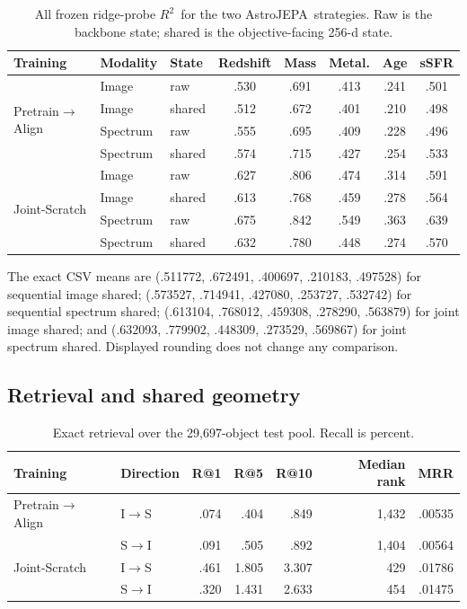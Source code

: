 \documentclass{article}
\newcommand{\method}{AstroJEPA}
\newcommand{\prealign}{Pretrain$\rightarrow$Align}
\newcommand{\joint}{Joint-Scratch}
\newcommand{\rscore}{$R^2$}
\begin{document}
\begin{table}[h]
\centering
\caption{All frozen ridge-probe \rscore\ for the two \method\ strategies.
Raw is the backbone state; shared is the objective-facing 256-d state.}
\label{tab:full_strategy_probes}
\scriptsize
\setlength{\tabcolsep}{3.6pt}
\begin{tabular}{lllccccc}
\toprule
Training & Modality & State & Redshift & Mass & Metal. & Age & sSFR\\
\midrule
\multirow{4}{*}{\prealign}
& Image & raw & .530 & .691 & .413 & .241 & .501\\
& Image & shared & .512 & .672 & .401 & .210 & .498\\
& Spectrum & raw & .555 & .695 & .409 & .228 & .496\\
& Spectrum & shared & .574 & .715 & .427 & .254 & .533\\
\midrule
\multirow{4}{*}{\joint}
& Image & raw & .627 & .806 & .474 & .314 & .591\\
& Image & shared & .613 & .768 & .459 & .278 & .564\\
& Spectrum & raw & .675 & .842 & .549 & .363 & .639\\
& Spectrum & shared & .632 & .780 & .448 & .274 & .570\\
\bottomrule
\end{tabular}
\end{table}

\FloatBarrier
The exact CSV means are
(.511772, .672491, .400697, .210183, .497528) for sequential image shared;
(.573527, .714941, .427080, .253727, .532742) for sequential spectrum shared;
(.613104, .768012, .459308, .278290, .563879) for joint image shared; and
(.632093, .779902, .448309, .273529, .569867) for joint spectrum shared.
Displayed rounding does not change any comparison.

\subsection{Retrieval and shared geometry}

\begin{table}[h]
\centering
\caption{Exact retrieval over the 29,697-object test pool. Recall is percent.}
\label{tab:strategy_retrieval}
\small
\begin{tabular}{llrrrrr}
\toprule
Training & Direction & R@1 & R@5 & R@10 & Median rank & MRR\\
\midrule
\prealign & I$\rightarrow$S & .074 & .404 & .849 & 1,432 & .00535\\
& S$\rightarrow$I & .091 & .505 & .892 & 1,404 & .00564\\
\joint & I$\rightarrow$S & .461 & 1.805 & 3.307 & 429 & .01786\\
& S$\rightarrow$I & .320 & 1.431 & 2.633 & 454 & .01475\\
\bottomrule
\end{tabular}
\end{table}
\end{document}
